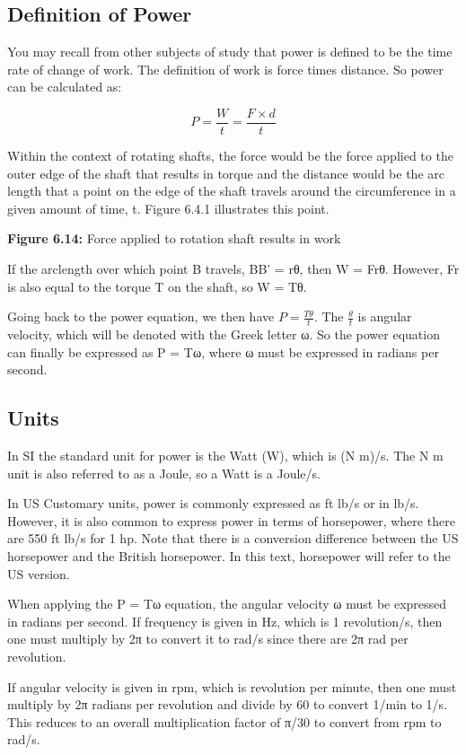\documentclass[
  letterpaper,
  DIV=11,
  numbers=noendperiod]{scrreprt}
\begin{document}
\subsection{Definition of Power}\label{definition-of-power}

You may recall from other subjects of study that power is defined to be
the time rate of change of work. The definition of work is force times
distance. So power can be calculated as:

\[
P=\frac{W}{t}=\frac{F \times d}{t}
\]

Within the context of rotating shafts, the force would be the force
applied to the outer edge of the shaft that results in torque and the
distance would be the arc length that a point on the edge of the shaft
travels around the circumference in a given amount of time, t. Figure
6.4.1 illustrates this point.

\textbf{Figure 6.14:} Force applied to rotation shaft results in work

If the arclength over which point B travels, BB' = rθ, then W = Frθ.
However, Fr is also equal to the torque T on the shaft, so W = Tθ.

Going back to the power equation, we then have \(P=\frac{T \theta}{t}\).
The \(\frac{\theta}{t}\) is angular velocity, which will be denoted with
the Greek letter ω. So the power equation can finally be expressed as P
= Tω, where ω must be expressed in radians per second.

\subsection{Units}\label{units-1}

In SI the standard unit for power is the Watt (W), which is (N m)/s. The
N m unit is also referred to as a Joule, so a Watt is a Joule/s.

In US Customary units, power is commonly expressed as ft lb/s or in
lb/s. However, it is also common to express power in terms of
horsepower, where there are 550 ft lb/s for 1 hp. Note that there is a
conversion difference between the US horsepower and the British
horsepower. In this text, horsepower will refer to the US version.

When applying the P = Tω equation, the angular velocity ω must be
expressed in radians per second. If frequency is given in Hz, which is 1
revolution/s, then one must multiply by 2π to convert it to rad/s since
there are 2π rad per revolution.

If angular velocity is given in rpm, which is revolution per minute,
then one must multiply by 2π radians per revolution and divide by 60 to
convert 1/min to 1/s. This reduces to an overall multiplication factor
of π/30 to convert from rpm to rad/s.
\end{document}
